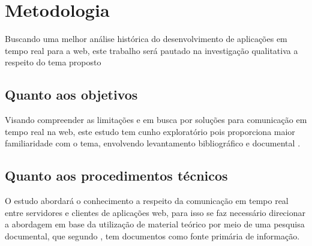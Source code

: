 \section{Metodologia}

Buscando uma melhor análise histórica do desenvolvimento de aplicações em tempo real para a web, este trabalho será pautado na investigação qualitativa a respeito do tema proposto

\subsection{Quanto aos objetivos}

Visando compreender as limitações e em busca por soluções para comunicação em tempo real na web, este estudo tem cunho exploratório pois proporciona maior familiaridade com o tema, envolvendo levantamento bibliográfico e documental \citep{gil2002elaborar}.

\subsection{Quanto aos procedimentos técnicos}

O estudo abordará o conhecimento a respeito da comunicação em tempo real entre servidores e clientes de aplicações web, para isso se faz necessário direcionar a abordagem em base da utilização de material teórico por meio de uma pesquisa documental, que segundo \cite{Marconi2003}, tem documentos como fonte primária de informação.

